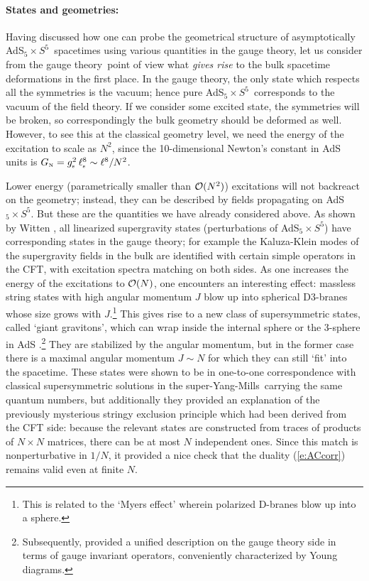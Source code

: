 \documentclass[12pt,a4paper]{article}
\def\req#1{(\ref{#1})}
\def\GT{gauge theory}
\def\SYM{super-Yang-Mills}
\def\gst{g_{\scriptscriptstyle {\rm s}}}
\def\GN{G_{\scriptscriptstyle {\rm N}}}
\def\lst{\ell_{\scriptscriptstyle {\rm s}}}
\def\adss#1#2{AdS$_{#1} \times S^{#2}$}
\def\Rads{\ell}
\begin{document}
\paragraph{States and geometries:}  %
Having discussed how one can probe the geometrical structure of asymptotically \adss55\ spacetimes using various quantities in  the \GT, let us consider from the \GT\  point of view what {\it gives rise} to the bulk spacetime deformations in the first place.  In the \GT, the only state which respects all the symmetries is the vacuum; hence pure \adss55\ corresponds to the vacuum of the field theory.  If we consider some excited state, the symmetries will be broken, so correspondingly the bulk geometry should be deformed as well.  However, to see this at the classical geometry level, we need the energy of the excitation to scale as $N^2$, since the 10-dimensional Newton's constant in AdS units is $\GN = \gst^2 \, 
\lst^8 \sim \Rads^8 / N^2$.  

Lower energy (parametrically smaller than ${\cal O}(N^2)$) excitations will not backreact on the geometry; instead, they can be described by fields propagating on \adss55.  
But these are the quantities we have already considered above.
As shown by Witten \cite{Witten:1998qj}, 
all linearized supergravity states (perturbations of \adss55) have corresponding states in the gauge theory; for example the Kaluza-Klein modes of the supergravity fields in the bulk are identified with certain simple operators in the CFT, with excitation spectra matching on both sides.
As one increases the energy of the excitations to ${\cal O}(N)$,  one encounters an interesting effect: massless string states with high angular momentum $J$ blow up into spherical D3-branes whose size grows with $J$.\footnote{
This is related to the `Myers effect' \cite{Myers:1999ps} wherein polarized D-branes blow up into a sphere. 
}  This gives rise to  a new class of supersymmetric states, called `giant gravitons', which can wrap inside the internal sphere \cite{McGreevy:2000cw} or the 3-sphere in AdS \cite{Hashimoto:2000zp}.\footnote{
Subsequently, \cite{Corley:2001zk} provided a unified description on the gauge theory side in terms of gauge invariant operators, conveniently characterized by Young diagrams.}
They are stabilized by the angular momentum, but in the former case  there is a maximal angular momentum $J \sim N$ for which they can still `fit' into the spacetime.
These states were shown to be in one-to-one correspondence with classical supersymmetric solutions in the \SYM\ carrying the same quantum numbers, but additionally they provided an explanation of the previously mysterious stringy exclusion principle \cite{Maldacena:1998bw} which had been derived from the CFT side: because the relevant states are constructed from traces of products of $N \times N$ matrices, there can be at most $N$ independent ones.  
Since this match is nonperturbative in $1/N$, it provided a nice check that the duality \req{e:ACcorr} remains valid even at finite $N$.
\end{document}
